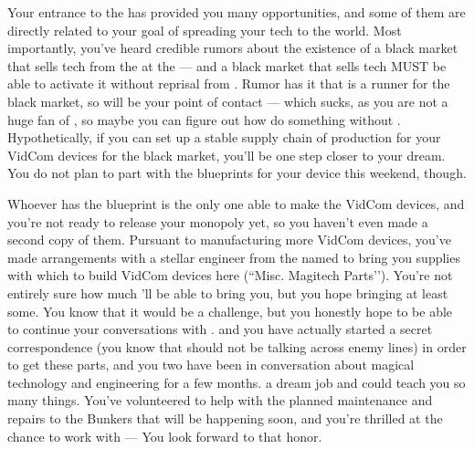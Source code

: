 \documentclass[char]{GL2020}
\begin{document}
Your entrance to the \pSchool{} has provided you many opportunities, and some of them are directly related to your goal of spreading your tech to the world. Most importantly, you've heard credible rumors about the existence of a black market that sells tech from the \pTech{} at the \pSc{} — and a black market that sells tech MUST be able to activate it without reprisal from \cTechGod{}. Rumor has it that \cLibAssist{\full} is a runner for the black market, so \cLibAssist{\they} will be your point of contact — which sucks, as you are not a huge fan of \cLibAssist{}, so maybe you can figure out how do something without \cLibAssist{\them}. Hypothetically, if you can set up a stable supply chain of production for your VidCom devices for the black market, you'll be one step closer to your dream. You do not plan to part with the blueprints for your device this weekend, though.  

Whoever has the blueprint is the only one able to make the VidCom devices, and you're not ready to release your monopoly yet, so you haven't even made a second copy of them.  Pursuant to manufacturing more VidCom devices, you've made arrangements with a stellar engineer from the \pShip{} named \cBunker{\full} to bring you supplies with which to build VidCom devices here (``Misc. Magitech Parts'’). You're not entirely sure how much \cBunker{\they}'ll be able to bring you, but you hope \cBunker{\theyare} bringing at least some. You know that it would be a challenge, but you honestly hope to be able to continue your conversations with \cBunker{}. \cBunker{} and you have actually started a secret correspondence (you know that \cBunker{} should not be talking across enemy lines) in order to get these parts, and you two have been in conversation about magical technology and engineering for a few months. \cBunker{\Theyhave} a dream job and could teach you so many things. You've volunteered to help with the planned maintenance and repairs to the Bunkers that will be happening soon, and you're thrilled at the chance to work with \cBunker{} —  You look forward to that honor. 
\end{document}
